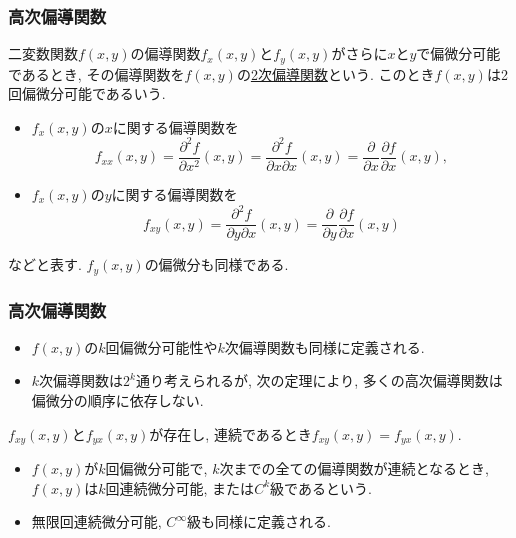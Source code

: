 

\begin{frame}
\frametitle{高次偏導関数}

\begin{Def}
二変数関数$f(x,y)$の偏導関数$f_x(x,y)$と$f_y(x,y)$がさらに$x$と$y$で偏微分可能であるとき, その偏導関数を$f(x,y)$の\underline{2次偏導関数}という. 
このとき$f(x,y)$は2回偏微分可能であるいう. 
\begin{itemize}
\item $f_x(x,y)$の$x$に関する偏導関数を
$$
f_{xx}(x,y)=\frac{\partial^2 f}{\partial x^2}(x,y)=\frac{\partial^2 f}{\partial x \partial x}(x,y)=\frac{\partial }{\partial x}\frac{\partial f}{\partial x}(x,y), 
$$
\item $f_x(x,y)$の$y$に関する偏導関数を
$$
f_{xy}(x,y)=\frac{\partial^2 f}{\partial y \partial x}(x,y)=\frac{\partial }{\partial y}\frac{\partial f}{\partial x}(x,y)
$$
\end{itemize}
などと表す. $f_y(x,y)$の偏微分も同様である. 
\end{Def}

\end{frame}





\begin{frame}
\frametitle{高次偏導関数}

\begin{itemize}
\item $f(x,y)$の$k$回偏微分可能性や$k$次偏導関数も同様に定義される. 
\item $k$次偏導関数は$2^k$通り考えられるが, 次の定理により, 多くの高次偏導関数は偏微分の順序に依存しない.  
\end{itemize}

\begin{Thm}
$f_{xy}(x,y)$と$f_{yx}(x,y)$が存在し, 連続であるとき$f_{xy}(x,y)=f_{yx}(x,y)$. 
\end{Thm}

\begin{itemize}
\item $f(x,y)$が$k$回偏微分可能で, $k$次までの全ての偏導関数が連続となるとき, $f(x,y)$は$k$回連続微分可能, または$C^k$級であるという. 
\item 無限回連続微分可能, $C^\infty$級も同様に定義される.
\end{itemize}
\end{frame}


